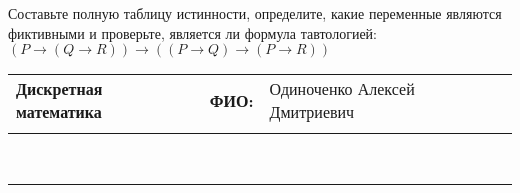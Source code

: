 \documentclass[10pt]{exam}
\newcommand{\class}{Дискретная математика}
\newcommand{\examdate}{}
\begin{document}
\begin{questions}
\begin{enumerate}[a)]
\end{enumerate}\question Составьте полную таблицу истинности, определите, какие переменные являются фиктивными и проверьте, является ли формула тавтологией:
$(P \rightarrow (Q \rightarrow R)) \rightarrow ((P \rightarrow Q) \rightarrow (P \rightarrow R))$

\end{questions}
\newpage
\begin{flushright}
\begin{tabular}{p{2.8in} r l}
\textbf{\class} & \textbf{ФИО:} &Одиноченко Алексей Дмитриевич
\\

\textbf{\examdate} &&\\
\end{tabular}\\
\end{flushright}
\rule[1ex]{\textwidth}{.1pt}
\end{document}
